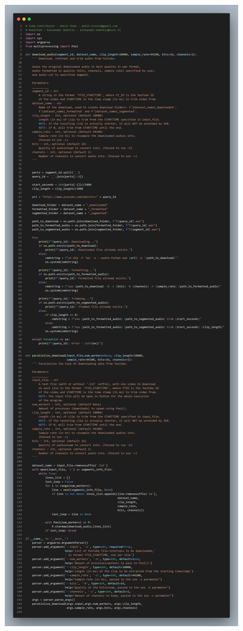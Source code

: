 \documentclass[aspectratio=169, 11pt]{beamer}
\begin{document}
\begin{frame}
\begin{columns}
\begin{column}{0.1\textwidth}
      \includegraphics[width=\textwidth]{image/short_code.png}
    \end{column}


\end{columns}
\end{frame}
\end{document}
